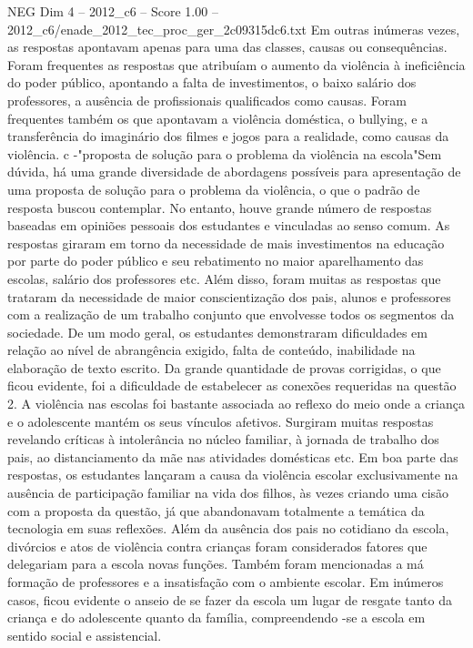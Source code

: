 \begin{textsample}{NEG Dim 4 – 2012\_c6 – Score 1.00 – 2012\_c6/enade\_2012\_tec\_proc\_ger\_2c09315dc6.txt}
Em outras inúmeras vezes, as respostas apontavam apenas para uma das classes, causas ou consequências.
Foram frequentes as respostas que atribuíam o aumento da violência à ineficiência do poder público, apontando a falta de investimentos, o baixo salário dos professores, a ausência de profissionais qualificados como causas.
Foram frequentes também os que apontavam a violência doméstica, o bullying, e a transferência do imaginário dos filmes e jogos para a realidade, como causas da violência. c -"proposta de solução para o problema da violência na escola"Sem dúvida, há uma grande diversidade de abordagens possíveis para apresentação de uma proposta de solução para o problema da violência, o que o padrão de resposta buscou contemplar.
No entanto, houve grande número de respostas baseadas em opiniões pessoais dos estudantes e vinculadas ao senso comum.
As respostas giraram em torno da necessidade de mais investimentos na educação por parte do poder público e seu rebatimento no maior aparelhamento das escolas, salário dos professores etc.
Além disso, foram muitas as respostas que trataram da necessidade de maior conscientização dos pais, alunos e professores com a realização de um trabalho conjunto que envolvesse todos os segmentos da sociedade.
De um modo geral, os estudantes demonstraram dificuldades em relação ao nível de abrangência exigido, falta de conteúdo, inabilidade na elaboração de texto escrito.
Da grande quantidade de provas corrigidas, o que ficou evidente, foi a dificuldade de estabelecer as conexões requeridas na questão 2.
A violência nas escolas foi bastante associada ao reflexo do meio onde a criança e o adolescente mantém os seus vínculos afetivos.
Surgiram muitas respostas revelando críticas à intolerância no núcleo familiar, à jornada de trabalho dos pais, ao distanciamento da mãe nas atividades domésticas etc.
Em boa parte das respostas, os estudantes lançaram a causa da violência escolar exclusivamente na ausência de participação familiar na vida dos filhos, às vezes criando uma cisão com a proposta da questão, já que abandonavam totalmente a temática da tecnologia em suas reflexões.
Além da ausência dos pais no cotidiano da escola, divórcios e atos de violência contra crianças foram considerados fatores que delegariam para a escola novas funções.
Também foram mencionadas a má formação de professores e a insatisfação com o ambiente escolar.
Em inúmeros casos, ficou evidente o anseio de se fazer da escola um lugar de resgate tanto da criança e do adolescente quanto da família, compreendendo -se a escola em sentido social e assistencial.

\end{textsample}
